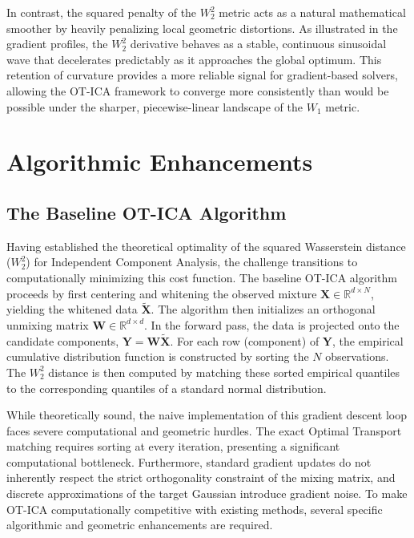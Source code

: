 \documentclass[12pt,a4paper,twoside,openany]{book}
\begin{document}
In contrast, the squared penalty of the $W_2^2$ metric acts as a natural mathematical smoother by heavily penalizing local geometric distortions. 
As illustrated in the gradient profiles, the $W_2^2$ derivative behaves as a stable, continuous sinusoidal wave that decelerates predictably as it approaches the global optimum. 
This retention of curvature provides a more reliable signal for gradient-based solvers, allowing the OT-ICA framework to converge more consistently 
than would be possible under the sharper, piecewise-linear landscape of the $W_1$ metric.


\chapter{Algorithmic Enhancements}

\section{The Baseline OT-ICA Algorithm}
Having established the theoretical optimality of the squared Wasserstein distance ($W_2^2$) for Independent Component Analysis, 
the challenge transitions to computationally minimizing this cost function. The baseline OT-ICA algorithm proceeds by first centering and whitening 
the observed mixture $\mathbf{X} \in \mathbb{R}^{d \times N}$, yielding the whitened data $\widetilde{\mathbf{X}}$. The algorithm then initializes 
an orthogonal unmixing matrix $\mathbf{W} \in \mathbb{R}^{d \times d}$. In the forward pass, the data is projected onto the candidate components, 
$\mathbf{Y} = \mathbf{W}\widetilde{\mathbf{X}}$. For each row (component) of $\mathbf{Y}$, the empirical cumulative distribution function is 
constructed by sorting the $N$ observations. The $W_2^2$ distance is then computed by matching these sorted empirical quantiles to the corresponding quantiles of a standard normal distribution. 

While theoretically sound, the naive implementation of this gradient descent loop faces severe computational and geometric hurdles. 
The exact Optimal Transport matching requires sorting at every iteration, presenting a significant computational bottleneck. 
Furthermore, standard gradient updates do not inherently respect the strict orthogonality constraint of the mixing matrix, 
and discrete approximations of the target Gaussian introduce gradient noise. To make OT-ICA computationally competitive with existing methods, 
several specific algorithmic and geometric enhancements are required.
\end{document}

